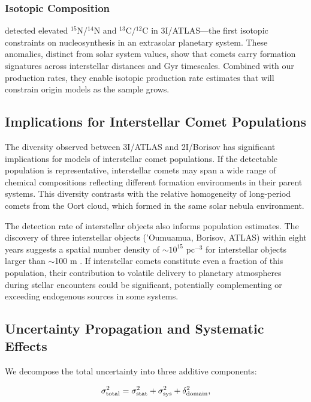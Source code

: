 \documentclass[preprint2]{aastex631}
\begin{document}
\subsubsection{Isotopic Composition}

\citet{opitom26} detected elevated $^{15}$N/$^{14}$N and $^{13}$C/$^{12}$C in 3I/ATLAS---the first isotopic constraints on nucleosynthesis in an extrasolar planetary system. These anomalies, distinct from solar system values, show that comets carry formation signatures across interstellar distances and Gyr timescales. Combined with our production rates, they enable isotopic production rate estimates that will constrain origin models as the sample grows.

\subsection{Implications for Interstellar Comet Populations}

The diversity observed between 3I/ATLAS and 2I/Borisov has significant implications for models of interstellar comet populations. If the detectable population is representative, interstellar comets may span a wide range of chemical compositions reflecting different formation environments in their parent systems. This diversity contrasts with the relative homogeneity of long-period comets from the Oort cloud, which formed in the same solar nebula environment.

The detection rate of interstellar objects also informs population estimates. The discovery of three interstellar objects ('Oumuamua, Borisov, ATLAS) within eight years suggests a spatial number density of $\sim 10^{15}$ pc$^{-3}$ for interstellar objects larger than $\sim$100 m \citep{jewitt22}. If interstellar comets constitute even a fraction of this population, their contribution to volatile delivery to planetary atmospheres during stellar encounters could be significant, potentially complementing or exceeding endogenous sources in some systems.

\subsection{Uncertainty Propagation and Systematic Effects}

We decompose the total uncertainty into three additive components:

\begin{equation}
\sigma_{\rm total}^2 = \sigma_{\rm stat}^2 + \sigma_{\rm sys}^2 + \delta_{\rm domain}^2,
\end{equation}
\end{document}
